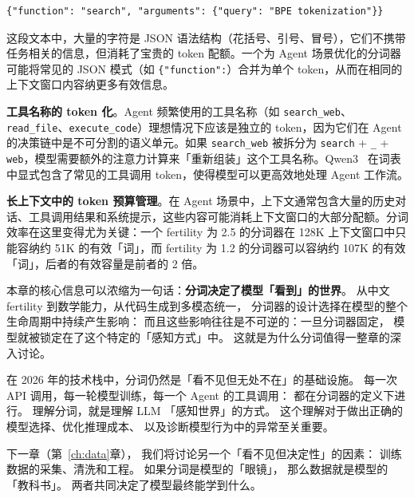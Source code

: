 \begin{lstlisting}[language={}]
{"function": "search", "arguments": {"query": "BPE tokenization"}}
\end{lstlisting}

这段文本中，大量的字符是 JSON 语法结构（花括号、引号、冒号），它们不携带任务相关的信息，但消耗了宝贵的 token 配额。一个为 Agent 场景优化的分词器可能将常见的 JSON 模式（如 \texttt{\{"function":}）合并为单个 token，从而在相同的上下文窗口内容纳更多有效信息。

\textbf{工具名称的 token 化}。Agent 频繁使用的工具名称（如 \texttt{search\_web}、\texttt{read\_file}、\texttt{execute\_code}）理想情况下应该是独立的 token，因为它们在 Agent 的决策链中是不可分割的语义单元。如果 \texttt{search\_web} 被拆分为 \texttt{search} + \texttt{\_} + \texttt{web}，模型需要额外的注意力计算来「重新组装」这个工具名称。Qwen3~\cite{qwen2025qwen3} 在词表中显式包含了常见的工具调用 token，使得模型可以更高效地处理 Agent 工作流。

\textbf{长上下文中的 token 预算管理}。在 Agent 场景中，上下文通常包含大量的历史对话、工具调用结果和系统提示，这些内容可能消耗上下文窗口的大部分配额。分词效率在这里变得尤为关键：一个 fertility 为 2.5 的分词器在 128K 上下文窗口中只能容纳约 51K 的有效「词」，而 fertility 为 1.2 的分词器可以容纳约 107K 的有效「词」，后者的有效容量是前者的 2 倍。

\begin{warnbox}[分词：简单表面下的深层影响]
本章的核心信息可以浓缩为一句话：\textbf{分词决定了模型「看到」的世界}。
从中文 fertility 到数学能力，从代码生成到多模态统一，
分词器的设计选择在模型的整个生命周期中持续产生影响：
而且这些影响往往是不可逆的：一旦分词器固定，
模型就被锁定在了这个特定的「感知方式」中。
这就是为什么分词值得一整章的深入讨论。

在 2026 年的技术栈中，分词仍然是「看不见但无处不在」的基础设施。
每一次 API 调用，每一轮模型训练，每一个 Agent 的工具调用：
都在分词器的定义下进行。
理解分词，就是理解 LLM 「感知世界」的方式。
这个理解对于做出正确的模型选择、优化推理成本、
以及诊断模型行为中的异常至关重要。

下一章（第~\ref{ch:data}章），
我们将讨论另一个「看不见但决定性」的因素：
训练数据的采集、清洗和工程。
如果分词是模型的「眼镜」，
那么数据就是模型的「教科书」。
两者共同决定了模型最终能学到什么。
\end{warnbox}


